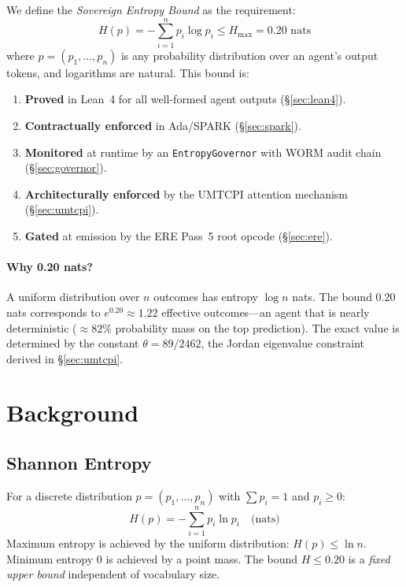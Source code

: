 \documentclass[sigconf,natbib=false]{acmart}
\begin{document}
We define the \emph{Sovereign Entropy Bound} as the requirement:
\[
  H(p) = -\sum_{i=1}^{n} p_i \log p_i \leq H_{\max} = 0.20 \text{ nats}
\]
where $p = (p_1,\ldots,p_n)$ is any probability distribution over an agent's
output tokens, and logarithms are natural. This bound is:
\begin{enumerate}
  \item \textbf{Proved} in Lean~4 for all well-formed agent outputs
    (\S\ref{sec:lean4}).
  \item \textbf{Contractually enforced} in Ada/SPARK (\S\ref{sec:spark}).
  \item \textbf{Monitored} at runtime by an \texttt{EntropyGovernor} with WORM
    audit chain (\S\ref{sec:governor}).
  \item \textbf{Architecturally enforced} by the UMTCPI attention mechanism
    (\S\ref{sec:umtcpi}).
  \item \textbf{Gated} at emission by the ERE Pass~5 root opcode
    (\S\ref{sec:ere}).
\end{enumerate}

\paragraph{Why 0.20 nats?}
A uniform distribution over $n$ outcomes has entropy $\log n$ nats. The bound
$0.20$ nats corresponds to $e^{0.20} \approx 1.22$ effective outcomes---an agent
that is nearly deterministic ($\approx 82\%$ probability mass on the top
prediction). The exact value is determined by the constant $\theta = 89/2462$,
the Jordan eigenvalue constraint derived in \S\ref{sec:umtcpi}.


\section{Background}

\subsection{Shannon Entropy}

For a discrete distribution $p = (p_1,\ldots,p_n)$ with $\sum p_i = 1$ and
$p_i \geq 0$:
\[
  H(p) = -\sum_{i=1}^{n} p_i \ln p_i \quad \text{(nats)}
\]
Maximum entropy is achieved by the uniform distribution: $H(p) \leq \ln n$.
Minimum entropy 0 is achieved by a point mass. The bound $H \leq 0.20$ is
a \emph{fixed upper bound} independent of vocabulary size.
\end{document}
